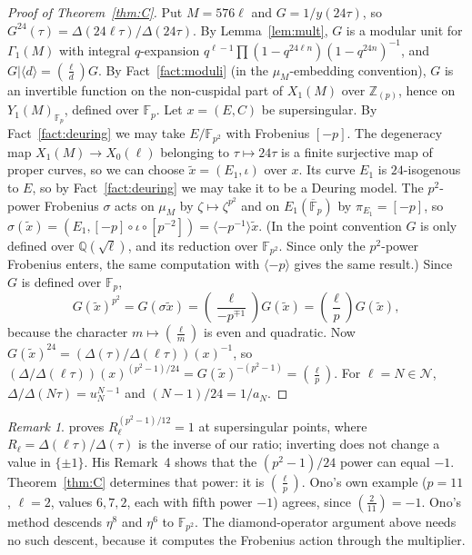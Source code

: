 \documentclass[11pt,a4paper]{article}
\numberwithin{equation}{section}
\theoremstyle{definition}
\theoremstyle{remark}
\newtheorem{remark}[theorem]{Remark}
\newcommand{\Fp}{\mathbb F_p}
\newcommand{\Fq}{\mathbb F_{p^2}}
\newcommand{\Fb}{\overline{\mathbb F}_p}
\newcommand{\Z}{\mathbb Z}
\newcommand{\Q}{\mathbb Q}
\newcommand{\leg}[2]{\left(\frac{#1}{#2}\right)}
\begin{document}
\begin{proof}[Proof of Theorem~\ref{thm:C}]
Put $M=576\ell$ and $G=1/y(24\tau)$, so $G^{24}(\tau)=\Delta(24\ell\tau)/\Delta(24\tau)$. By
Lemma~\ref{lem:mult}, $G$ is a modular unit for $\Gamma_1(M)$ with integral $q$-expansion
$q^{\ell-1}\prod(1-q^{24\ell n})(1-q^{24n})^{-1}$, and $G|\langle d\rangle=\leg{\ell}{d}G$. By
Fact~\ref{fact:moduli} (in the $\mu_M$-embedding convention), $G$ is an invertible function on the non-cuspidal part of
$X_1(M)$ over $\Z_{(p)}$, hence on $Y_1(M)_{\Fp}$, defined over $\Fp$. Let $x=(E,C)$ be supersingular. By Fact~\ref{fact:deuring} we may
take $E/\Fq$ with Frobenius $[-p]$. The degeneracy map $X_1(M)\to X_0(\ell)$ belonging to $\tau\mapsto24\tau$ is a finite surjective map of proper curves, so we can choose
$\tilde x=(E_1,\iota)$ over $x$. Its curve $E_1$ is $24$-isogenous to $E$, so by Fact~\ref{fact:deuring} we may take it to be a
Deuring model. The $p^2$-power Frobenius $\sigma$ acts on $\mu_M$ by $\zeta\mapsto\zeta^{p^2}$ and on
$E_1(\Fb)$ by $\pi_{E_1}=[-p]$, so
$\sigma(\tilde x)=(E_1,[-p]\circ\iota\circ[p^{-2}])=\langle-p^{-1}\rangle\tilde x$. (In the point convention $G$ is only defined over $\Q(\sqrt\ell)$, and its reduction over $\Fq$. Since only the
$p^2$-power Frobenius enters, the same computation with $\langle-p\rangle$ gives the same result.) Since $G$ is defined over $\Fp$,
\[
G(\tilde x)^{p^2}=G(\sigma\tilde x)=\leg{\ell}{-p^{\mp1}}G(\tilde x)=\leg{\ell}{p}G(\tilde x),
\]
because the character $m\mapsto\leg{\ell}{m}$ is even and quadratic. Now $G(\tilde x)^{24}=(\Delta(\tau)/\Delta(\ell\tau))(x)^{-1}$, so
$(\Delta/\Delta(\ell\tau))(x)^{(p^2-1)/24}=G(\tilde x)^{-(p^2-1)}=\leg{\ell}{p}$. For
$\ell=N\in\mathcal N$, $\Delta/\Delta(N\tau)=u_N^{N-1}$ and $(N-1)/24=1/a_N$.
\end{proof}

\begin{remark}
\citet[Thm.~1.2]{Ono25} proves $R_\ell^{(p^2-1)/12}=1$ at supersingular points, where $R_\ell=\Delta(\ell\tau)/\Delta(\tau)$ is
the inverse of our ratio; inverting does not change a value in $\{\pm1\}$. His Remark~4 shows that the $(p^2-1)/24$ power
can equal $-1$. Theorem~\ref{thm:C}
determines that power: it is $\leg{\ell}{p}$. Ono's own example ($p=11$, $\ell=2$, values $6,7,2$,
each with fifth power $-1$) agrees, since $\leg{2}{11}=-1$. Ono's method descends $\eta^8$ and $\eta^6$
to $\Fq$. The diamond-operator argument above needs no such descent, because it computes the
Frobenius action through the multiplier.
\end{remark}
\end{document}
